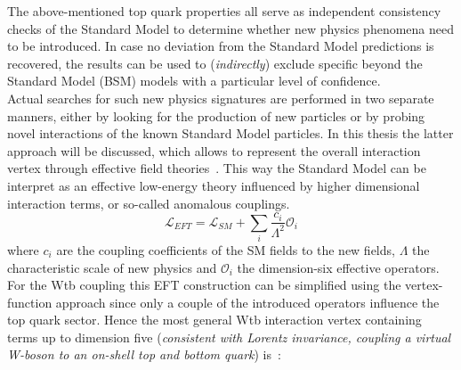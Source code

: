 The above-mentioned top quark properties all serve as independent consistency checks of the Standard Model to determine whether new physics phenomena need to be introduced. In case no deviation from the Standard Model predictions is recovered, the results can be used to (\textit{indirectly}) exclude specific beyond the Standard Model (BSM) models with a particular level of confidence.
\\
Actual searches for such new physics signatures are performed in two separate manners, either by looking for the production of new particles or by probing novel interactions of the known Standard Model particles.
In this thesis the latter approach will be discussed, which allows to represent the overall interaction vertex through effective field theories~\cite{}. This way the Standard Model can be interpret as an effective low-energy theory influenced by higher dimensional interaction terms, or so-called anomalous couplings.
\begin{equation}
 \mathcal{L}_{EFT} = \mathcal{L}_{SM} + \sum_{i} \frac{c_i}{\Lambda^{2}} \mathcal{O}_i
\end{equation}
where $c_i$ are the coupling coefficients of the SM fields to the new fields, $\Lambda$ the characteristic scale of new physics and $\mathcal{O}_i$ the dimension-six effective operators.
\\
For the Wtb coupling this EFT construction can be simplified using the vertex-function approach since only a couple of the introduced operators influence the top quark sector. Hence the most general Wtb interaction vertex containing terms up to dimension five (\textit{consistent with Lorentz invariance, coupling a virtual W-boson to an on-shell top and bottom quark}) is~\cite{EFTLinkWithWtb, RecentWtbZhang}:
